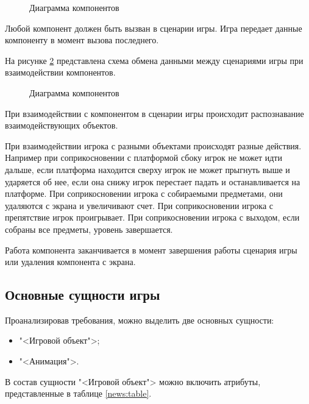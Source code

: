 \begin{figure}[ht]
\caption{Диаграмма компонентов}
\label{comp:image}
\end{figure}

Любой компонент должен быть вызван в сценарии игры. Игра передает данные компоненту в момент вызова последнего.

На рисунке \ref{data:image} представлена схема обмена данными между сценариями игры при взаимодействии компонентов.

\begin{figure}[ht]
\caption{Диаграмма компонентов}
\label{data:image}
\end{figure}

При взаимодействии с компонентом в сценарии игры происходит распознавание взаимодействующих объектов.

При взаимодействии игрока с разными объектами происходят разные действия. Например при соприкосновении с платформой сбоку игрок не может идти дальше, если платформа находится сверху игрок не может прыгнуть выше и ударяется об нее, если она снижу игрок перестает падать и останавливается на платформе. При соприкосновении игрока с собираемыми предметами, они удаляются с экрана и увеличивают счет. При соприкосновении игрока с препятствие игрок проигрывает. При соприкосновении игрока с выходом, если собраны все предметы, уровень завершается.

Работа компонента заканчивается в момент завершения работы сценария игры или удаления компонента с экрана.

\subsection{Основные сущности игры}

Проанализировав требования, можно выделить две основных сущности:
\begin{itemize}
\item "<Игровой объект">;
\item "<Анимация">.
\end{itemize}

В состав сущности "<Игровой объект"> можно включить атрибуты, представленные в таблице \ref{news:table}.

